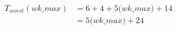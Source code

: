 \begin{align}
\label{eq:analyse-arlabeling-neighbour}
T_{worst}(\mathit{wk\_max})& = 6 + 4 + 5 \mathit(wk\_max) + 14 \\
& = 5 \mathit(wk\_max) + 24 \nonumber
\end{align}
